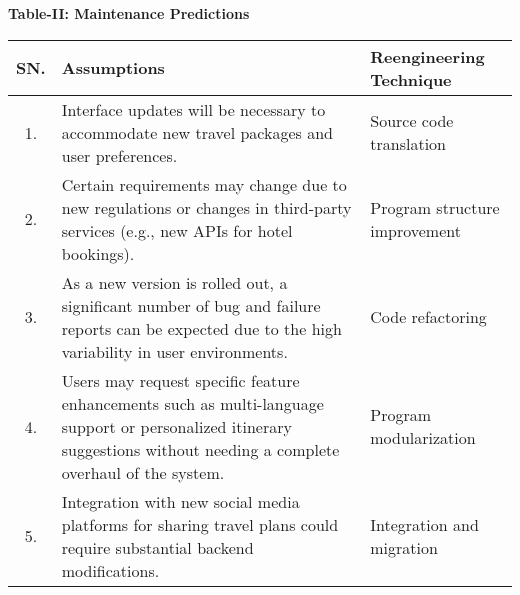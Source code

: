 \documentclass{scrreprt}
\begin{document}
\begin{center}
    \parbox{0.8\textwidth}{ 
        \centering
        \textbf{Table-II: Maintenance Predictions}
    }
\end{center}

\begin{table}[h!]
\centering
\begin{tabular}{|c|>{\raggedright\arraybackslash}p{8cm}|>{\raggedright\arraybackslash}p{4cm}|}
\hline
\textbf{SN.} & \textbf{Assumptions} & \textbf{Reengineering Technique} \\
\hline
1. & Interface updates will be necessary to accommodate new travel packages and user preferences. & Source code translation \\
\hline
2. & Certain requirements may change due to new regulations or changes in third-party services (e.g., new APIs for hotel bookings). & Program structure improvement \\
\hline
3. & As a new version is rolled out, a significant number of bug and failure reports can be expected due to the high variability in user environments. & Code refactoring \\
\hline
4. & Users may request specific feature enhancements such as multi-language support or personalized itinerary suggestions without needing a complete overhaul of the system. & Program modularization \\
\hline
5. & Integration with new social media platforms for sharing travel plans could require substantial backend modifications. & Integration and migration \\
\hline
\end{tabular}
\label{table:maintenance_predictions}
\end{table}
\end{document}
